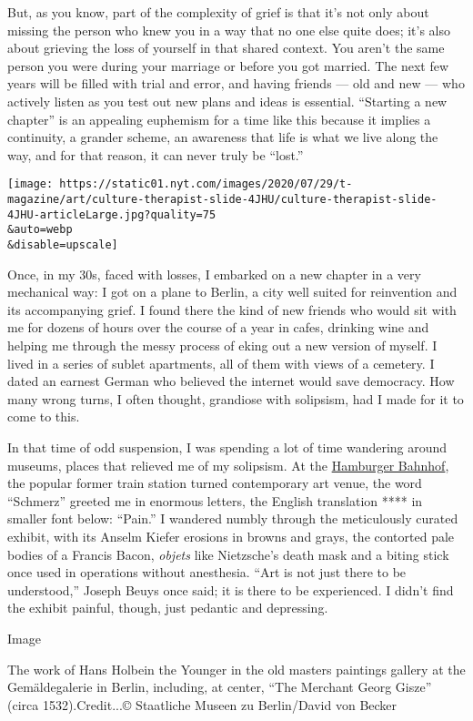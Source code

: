 But, as you know, part of the complexity of grief is that it's not only
about missing the person who knew you in a way that no one else quite
does; it's also about grieving the loss of yourself in that shared
context. You aren't the same person you were during your marriage or
before you got married. The next few years will be filled with trial and
error, and having friends --- old and new --- who actively listen as you
test out new plans and ideas is essential. ``Starting a new chapter'' is
an appealing euphemism for a time like this because it implies a
continuity, a grander scheme, an awareness that life is what we live
along the way, and for that reason, it can never truly be ``lost.''

\texttt{[image: https://static01.nyt.com/images/2020/07/29/t-magazine/art/culture-therapist-slide-4JHU/culture-therapist-slide-4JHU-articleLarge.jpg?quality=75\\\&auto=webp\\\&disable=upscale]}

Once, in my 30s, faced with losses, I embarked on a new chapter in a
very mechanical way: I got on a plane to Berlin, a city well suited for
reinvention and its accompanying grief. I found there the kind of new
friends who would sit with me for dozens of hours over the course of a
year in cafes, drinking wine and helping me through the messy process of
eking out a new version of myself. I lived in a series of sublet
apartments, all of them with views of a cemetery. I dated an earnest
German who believed the internet would save democracy. How many wrong
turns, I often thought, grandiose with solipsism, had I made for it to
come to this.

In that time of odd suspension, I was spending a lot of time wandering
around museums, places that relieved me of my solipsism. At the
\href{https://www.nytimes.com/2018/04/24/arts/berlin-hamburger-banhof.html}{Hamburger
Bahnhof}, the popular former train station turned contemporary art
venue, the word ``Schmerz'' greeted me in enormous letters, the English
translation **** in smaller font below: ``Pain.'' I wandered numbly
through the meticulously curated exhibit, with its Anselm Kiefer
erosions in browns and grays, the contorted pale bodies of a Francis
Bacon, \emph{objets} like Nietzsche's death mask and a biting stick once
used in operations without anesthesia. ``Art is not just there to be
understood,'' Joseph Beuys once said; it is there to be experienced. I
didn't find the exhibit painful, though, just pedantic and depressing.

Image

The work of Hans Holbein the Younger in the old masters paintings
gallery at the Gemäldegalerie in Berlin, including, at center, ``The
Merchant Georg Gisze'' (circa 1532).Credit...© Staatliche Museen zu
Berlin/David von Becker

